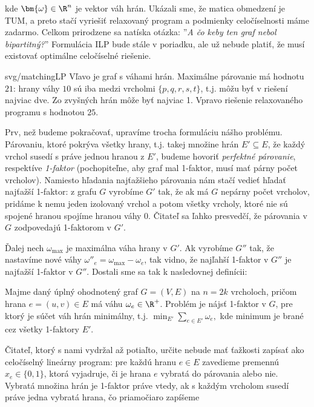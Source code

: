 \noindent
kde $\bm{\omega}\in\R^n$ je vektor váh hrán. Ukázali sme, že matica obmedzení je TUM, a preto stačí vyriešiť 
relaxovaný program a podmienky celočíselnosti máme zadarmo. Celkom prirodzene sa natíska otázka: 
''{\em A čo keby ten graf nebol bipartitný?}'' Formulácia ILP bude stále v poriadku, ale už nebude platiť, že
musí existovať optimálne celočíselné riešenie.


\begin{myfig}{0.8\textwidth}{svg/matchingLP}
  Vľavo je graf s váhami hrán. Maximálne párovanie má hodnotu $21$: hrany váhy $10$ sú iba medzi vrcholmi 
  $\{p,q,r,s,t\}$, t.j. môžu byť v riešení najviac dve. Zo zvyšných hrán môže byť najviac 1.
  Vpravo riešenie relaxovaného programu s hodnotou $25$.
\end{myfig}

\noindent
Prv, než budeme pokračovať, upravíme trocha formuláciu nášho problému. Párovaniu, ktoré pokrýva všetky hrany,
t.j. takej množine hrán $E'\subseteq E$, že každý vrchol susedí s práve jednou hranou z $E'$, 
budeme hovoriť {\em perfektné párovanie}, respektíve {\em 1-faktor} (pochopiteľne, aby graf mal 1-faktor,
musí mať párny počet vrcholov). Namiesto hľadania najťažšieho párovania
nám stačí vedieť hľadať najťažší 1-faktor: z grafu $G$ vyrobíme $G'$ tak, že ak má  $G$ nepárny počet 
vrcholov, pridáme k nemu jeden izolovaný vrchol a potom všetky vrcholy, ktoré nie sú spojené hranou spojíme
hranou váhy 0. Čitateľ sa ľahko presvedčí, že párovania v $G$ zodpovedajú 1-faktorom v $G'$.

\noindent
Ďalej nech $\omega_{\max}$ je maximálna váha hrany v $G'$. Ak vyrobíme $G''$ tak, že
nastavíme nové váhy $\omega''_e=\omega_{\max}-\omega_e$, tak vidno, že najľahší 1-faktor v $G''$ je 
najťažší 1-faktor v $G''$. Dostali sme sa tak k nasledovnej definícii:

\begin{framed}
  \begin{dfn}
    \label{dfn:minFactor}
    Majme daný úplný ohodnotený graf $G=(V,E)$ na $n=2k$ vrcholoch, pričom hrana
    $e=(u,v)\in E$ má váhu $\omega_e\in\R^+$.  Problém \minfactor je 
    nájsť 1-faktor v $G$, pre ktorý je súčet váh hrán
    minimálny, t.j.
    $\min_{E'}\sum_{e\in E'}\omega_e,$
    kde minimum je brané cez všetky 1-faktory $E'$.\end{dfn}\end{framed}


\noindent
Čitateľ, ktorý s nami vydržal až potiaľto, určite nebude mať ťažkosti zapísať \minfactor ako celočíselný
lineárny program:
pre každú hranu $e\in E$ zavedieme premennú $x_e\in\{0,1\}$, ktorá
vyjadruje, či je hrana $e$ vybratá do párovania alebo nie.
Vybratá množina hrán je 1-faktor práve vtedy, ak s každým vrcholom susedí práve jedna vybratá
hrana, čo priamočiaro zapíšeme

